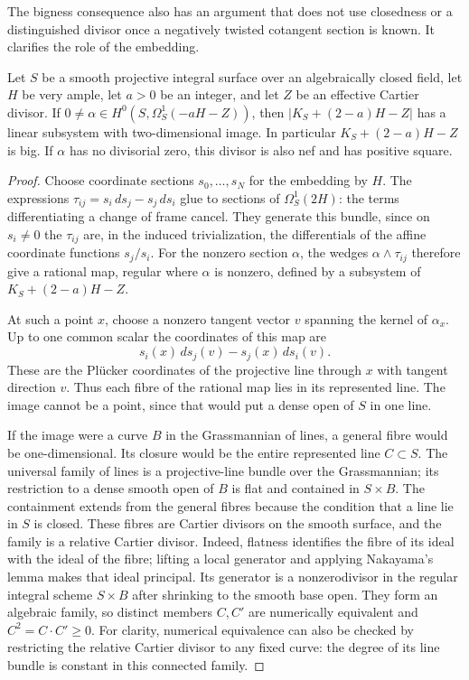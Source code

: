 The bigness consequence also has an argument that does not use
closedness or a distinguished divisor once a negatively twisted
cotangent section is known. It clarifies the role of the embedding.

\begin{lemma}\label{lem:negative-cotangent-adjoint}
Let $S$ be a smooth projective integral surface over an algebraically
closed field, let $H$ be very ample, let $a>0$ be an integer,
and let $Z$ be an effective Cartier divisor.
If $0\ne\alpha\in H^0(S,\Omega^1_S(-aH-Z))$, then
$|K_S+(2-a)H-Z|$ has a linear subsystem with two-dimensional image.
In particular $K_S+(2-a)H-Z$ is big. If $\alpha$ has no
divisorial zero, this divisor is also nef and has positive square.
\end{lemma}

\begin{proof}
Choose coordinate sections $s_0,\ldots,s_N$ for the embedding by $H$.
The expressions $\tau_{ij}=s_i\,ds_j-s_j\,ds_i$ glue to sections of
$\Omega^1_S(2H)$: the terms differentiating a change of frame cancel.
They generate this bundle, since on $s_i\ne0$ the $\tau_{ij}$ are,
in the induced trivialization, the differentials of the affine
coordinate functions $s_j/s_i$.
For the nonzero section $\alpha$, the wedges
$\alpha\wedge\tau_{ij}$ therefore give a rational map, regular where
$\alpha$ is nonzero, defined by a subsystem of $K_S+(2-a)H-Z$.

At such a point $x$, choose a nonzero tangent vector $v$ spanning the
kernel of $\alpha_x$. Up to one common scalar the coordinates of this
map are
\[
 s_i(x)\,ds_j(v)-s_j(x)\,ds_i(v).
\]
These are the Pl\"ucker coordinates of the projective line through
$x$ with tangent direction $v$. Thus each fibre of the rational map
lies in its represented line. The image cannot be a point, since
that would put a dense open of $S$ in one line.

If the image were a curve $B$ in the Grassmannian of lines, a general
fibre would be one-dimensional. Its closure would be the entire
represented line $C\subset S$. The universal family of lines is a
projective-line bundle over the Grassmannian; its restriction to a
dense smooth open of $B$ is flat and contained in $S\times B$.
The containment extends from the general fibres because the condition
that a line lie in $S$ is closed. These fibres are Cartier divisors on
the smooth surface, and the family is a relative Cartier divisor.
Indeed, flatness identifies the fibre of its ideal with the ideal of
the fibre; lifting a local generator and applying Nakayama's lemma
makes that ideal principal. Its generator is a nonzerodivisor in the
regular integral scheme $S\times B$ after shrinking to the smooth
base open. They form an algebraic family, so distinct members
$C,C'$ are numerically equivalent and
$C^2=C\cdot C'\geq0$.
For clarity, numerical equivalence can also be checked by restricting
the relative Cartier divisor to any fixed curve: the degree of its
line bundle is constant in this connected family.


\end{proof}
